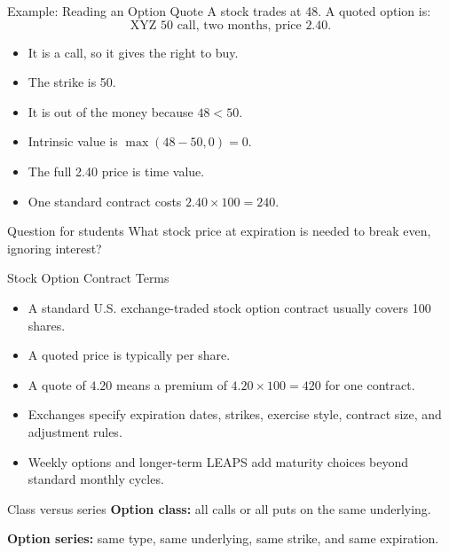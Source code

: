 \documentclass[aspectratio=169,11pt]{beamer}
\begin{document}
\begin{frame}{Example: Reading an Option Quote}
    A stock trades at 48. A quoted option is:
    \[
        \text{XYZ 50 call, two months, price } 2.40.
    \]

    \begin{itemize}
        \item It is a call, so it gives the right to buy.
        \item The strike is 50.
        \item It is out of the money because \(48<50\).
        \item Intrinsic value is \(\max(48-50,0)=0\).
        \item The full 2.40 price is time value.
        \item One standard contract costs \(2.40\times 100=240\).
    \end{itemize}

    \begin{block}{Question for students}
        What stock price at expiration is needed to break even, ignoring interest?
    \end{block}
\end{frame}

\begin{frame}{Stock Option Contract Terms}
    \begin{itemize}
        \item A standard U.S. exchange-traded stock option contract usually covers 100 shares.
        \item A quoted price is typically per share.
        \item A quote of \(4.20\) means a premium of \(4.20\times 100=420\) for one contract.
        \item Exchanges specify expiration dates, strikes, exercise style, contract size, and adjustment rules.
        \item Weekly options and longer-term LEAPS add maturity choices beyond standard monthly cycles.
    \end{itemize}

    \begin{block}{Class versus series}
        \textbf{Option class:} all calls or all puts on the same underlying.

        \textbf{Option series:} same type, same underlying, same strike, and same expiration.
    \end{block}
\end{frame}
\end{document}
